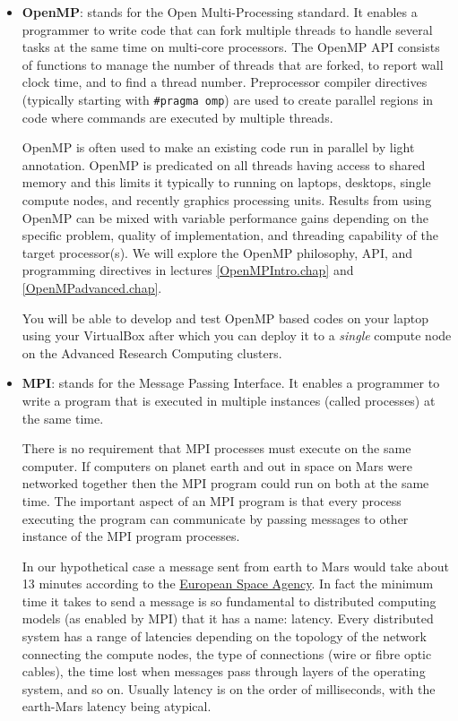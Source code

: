 \begin{itemize}
    \item {\bf OpenMP}: stands for the Open Multi-Processing standard. It enables a programmer to write code that can fork multiple threads to handle several tasks at the same time on multi-core processors. The OpenMP API consists of functions to manage the number of threads that are forked, to report wall clock time, and to find a thread number. Preprocessor compiler directives (typically starting with \texttt{\#pragma omp}) are used to create parallel regions in code where commands are executed by multiple threads. 
    
    OpenMP is often used to make an existing code run in parallel by light annotation. OpenMP is predicated on all threads having access to shared memory and this limits it typically to running on laptops, desktops, single compute nodes, and recently graphics processing units. Results from using OpenMP can be mixed with variable performance gains depending on the specific problem, quality of implementation, and threading capability of the target processor(s). We will explore the OpenMP philosophy, API, and programming directives in lectures \ref{OpenMPIntro.chap} and \ref{OpenMPadvanced.chap}. 
    
    You will be able to develop and test OpenMP based codes on your laptop using your VirtualBox after which you can deploy it to a \emph{single} compute node on the Advanced Research Computing clusters.
    
    \item{\bf MPI}: stands for the Message Passing Interface. It enables a programmer to write a program that is executed in multiple instances (called processes) at the same time. 
    
    There is no requirement that MPI processes must execute on the same computer. If computers on planet earth and out in space on Mars were networked together then the MPI program could run on both at the same time. The important aspect of an MPI program is that every process executing the program can communicate by passing messages to other instance of the MPI program processes. 
    
    In our hypothetical case a message sent from earth to Mars would take about 13 minutes according to the  \href{http://blogs.esa.int/mex/2012/08/05/time-delay-between-mars-and-earth/}{European Space Agency}. In fact the minimum time it takes to send a message is so fundamental to distributed computing models (as enabled by MPI) that it has a name: latency. Every distributed system has a range of latencies depending on the topology of the network connecting the compute nodes, the type of connections (wire or fibre optic cables), the time lost when messages pass through layers of the operating system, and so on. Usually latency is on the order of milliseconds, with the earth-Mars latency being atypical.
    

\end{itemize}
